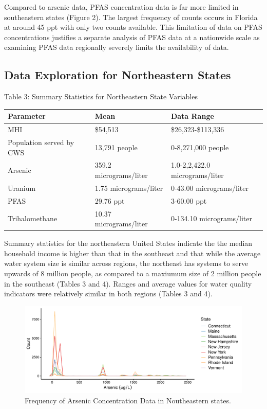 \documentclass[12pt,]{article}
\begin{document}
Compared to arsenic data, PFAS concentration data is far more limited in
southeastern states (Figure 2). The largest frequency of counts occurs
in Florida at around 45 ppt with only two counts available. This
limitation of data on PFAS concentrations justifies a separate analysis
of PFAS data at a nationwide scale as examining PFAS data regionally
severely limits the availability of data.

\newpage

\hypertarget{data-exploration-for-northeastern-states}{%
\subsection{Data Exploration for Northeastern
States}\label{data-exploration-for-northeastern-states}}

Table 3: Summary Statistics for Northeastern State Variables

\begin{longtable}[]{@{}lll@{}}
\toprule
\textbf{Parameter} & \textbf{Mean} & \textbf{Data Range}\tabularnewline
\midrule
\endhead
MHI & \$54,513 & \$26,323-\$113,336\tabularnewline
Population served by CWS & 13,791 people & 0-8,271,000
people\tabularnewline
Arsenic & 359.2 micrograms/liter & 1.0-2,2,422.0
micrograms/liter\tabularnewline
Uranium & 1.75 micrograms/liter & 0-43.00
micrograms/liter\tabularnewline
PFAS & 29.76 ppt & 3-60.00 ppt\tabularnewline
Trihalomethane & 10.37 micrograms/liter & 0-134.10
micrograms/liter\tabularnewline
\bottomrule
\end{longtable}

Summary statistics for the northeastern United States indicate the the
median household income is higher than that in the southeast and that
while the average water system size is similar across regions, the
northeast has systems to serve upwards of 8 million people, as compared
to a maxiumum size of 2 million people in the southeast (Tables 3 and
4). Ranges and average values for water quality indicators were
relatively similar in both regions (Tables 3 and 4).

\begin{figure}
\centering
\includegraphics{Project_Template_files/figure-latex/figs3-1.pdf}
\caption{Frequency of Arsenic Concentration Data in Noutheastern
states.}
\end{figure}
\end{document}
